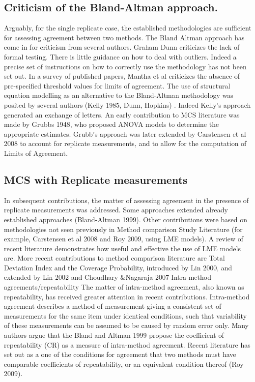 \subsection*{Criticism of the Bland-Altman approach.}
Arguably, for the single replicate case, the established methodologies are sufficient for assessing agreement between two methods.
The Bland Altman approach has come in for criticism from several authors.  Graham Dunn criticizes the lack of formal testing.  There is little guidance on how to deal with outliers.
Indeed a precise set of instructions on how to correctly use the methodology has not been set out. In a survey of published papers, Mantha et al criticizes the absence of pre-specified threshold values for limits of agreement.
The use of structural equation modelling as an alternative to the Bland-Altman methodology was posited by several authors (Kelly 1985, Dunn, Hopkins) . Indeed Kelly’s approach generated an exchange of letters.                                                
An early contribution to MCS literature was made by Grubbs 1948, who proposed ANOVA models to determine the appropriate estimates. Grubb’s approach was later extended by Carstensen et al 2008 to account for replicate measurements, and to allow for the computation of Limits of Agreement.
\subsection*{MCS with Replicate measurements}
In subsequent contributions, the matter of assessing agreement in the presence  of replicate measurements was addressed. Some approaches extended already established approaches (Bland-Altman 1999).  Other contributions were based on methodologies not seen previously in Method comparison Study Literature  (for example, Carstensen et al 2008 and Roy 2009, using LME models). 
A review of recent literature demonstrates how useful and effective the use of LME models are.
More recent contributions to method comparison literature are Total Deviation Index and the Coverage Probability, introduced by Lin 2000, and extended by Lin 2002 and Choudhary &Nagaraja 2007
Intra-method agreements/repeatability
The matter of intra-method agreement, also known as repeatability, has received greater attention in recent contributions. Intra-method agreement describes a method of measurement giving a consistent set of measurements for the same item under identical conditions, such that variability of these measurements can be assumed to be caused by random error only. Many authors argue that the
Bland and Altman 1999 propose the coefficient of repeatability (CR) as a measure of intra-method agreement. Recent literature has set out as a one of the conditions for agreement that two methods must have comparable coefficients of repeatability, or an equivalent condition thereof (Roy 2009).
